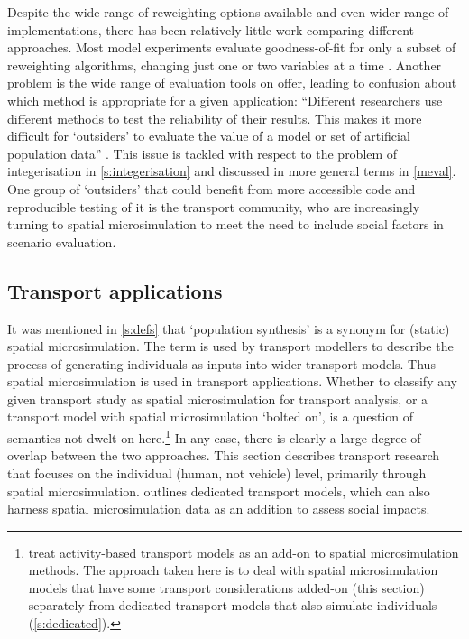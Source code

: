 Despite the wide range of reweighting options available and even wider
range of implementations, there has been relatively little work comparing
different approaches. Most model experiments evaluate goodness-of-fit for
only a subset of reweighting algorithms, changing just one or two variables
at a time \citep{Voas2000, Smith2009, Rahman2010}. Another problem is the
wide range of evaluation tools on offer, leading to confusion about
which method is appropriate for a given application:
``Different researchers use different methods to test the
reliability of their results. This makes it more difficult for `outsiders'
to evaluate the value of a model or set of artificial population data''
\citep[p.282]{Hermes2012a}. This issue is tackled with respect
to the problem of integerisation in \cref{s:integerisation}
and discussed in more general terms in \cref{meval}. One group
of `outsiders' that could benefit from more accessible code and
reproducible testing of it is the transport community, who are increasingly
turning to spatial microsimulation to meet the need to include
social factors in scenario evaluation.

\subsection{Transport applications}
It was mentioned in \cref{s:defs} that `population synthesis' is a synonym for
(static) spatial microsimulation. The term is used by transport modellers
to describe the
process of generating individuals as inputs into wider transport models.
Thus spatial microsimulation is used in transport applications.
Whether to classify any given transport study as spatial microsimulation for
transport analysis, or a transport model with spatial microsimulation
`bolted on', is a question of semantics not dwelt on
here.\footnote{\citet{Ballas2013-4policy-analysis}
treat activity-based
transport models as an add-on to spatial microsimulation methods.
The approach taken here is to deal with 
spatial microsimulation models that have some transport
considerations added-on (this section) separately from
dedicated transport models  that also simulate individuals
(\cref{s:dedicated}).}
In any case, there is clearly a
large degree of overlap between
the two approaches. This section describes transport research that focuses on the
individual (human, not vehicle) level, primarily through spatial microsimulation.
 outlines dedicated transport models, which can also harness
spatial microsimulation data as an addition to assess social impacts.

